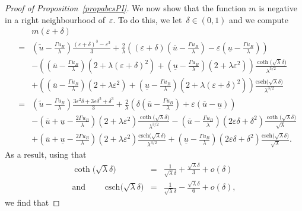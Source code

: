 \documentclass[12pt,a4paper,intlimits,sumlimits]{amsart}
\theoremstyle{definition}
\theoremstyle{plain}
\numberwithin{equation}{section}
\begin{document}
\begin{proof}[Proof of Proposition~\ref{propabcsPI}]
We now show that the function $m$ is negative in a right neighbourhood of~$\varepsilon$. To do this, we let~$\delta\in(0,1)$ and we compute
\begin{eqnarray*}&&
m(\varepsilon+\delta)\\&=&
\left(\widetilde u-\frac{\Gamma u_B}\lambda\right)
\frac{(\varepsilon+\delta)^3-\varepsilon^3}{3}
+\frac2{\lambda}\left(
(\varepsilon+\delta)\left(\overline{u}-\frac{\Gamma u_B}{\lambda}\right)
-\varepsilon\left(\underline{u}-\frac{\Gamma u_B}{\lambda}
\right)\right)
\\&&
-\left(
\left(\overline{u}-\frac{\Gamma u_B}{\lambda}\right)
(2 + \lambda (\varepsilon+\delta)^2) 
+\left(\underline{u}-\frac{\Gamma u_B}{\lambda}
\right)(2 + \lambda \varepsilon^2) \right)
\frac{\coth\big(\sqrt\lambda \delta\big)}{\lambda^{3/2}}
\\&&+
\left(
\left(\overline{u}-\frac{\Gamma u_B}{\lambda}\right)(2 + \lambda \varepsilon^2) 
+
\left(\underline{u}-\frac{\Gamma u_B}{\lambda}\right)
(2 + \lambda (\varepsilon+\delta)^2) \right)
\frac{\text{csch}\big(\sqrt{\lambda}\delta\big)}{\lambda^{3/2}}\\
&=&\left(\widetilde u-\frac{\Gamma u_B}\lambda\right)
\frac{3\varepsilon^2\delta+3\varepsilon\delta^2+\delta^3}{3}
+\frac2{\lambda}\left(
\delta\left(\overline{u}-\frac{\Gamma u_B}{\lambda}\right)
+\varepsilon(\overline{u}-\underline{u})\right)
\\&&
-\left(\overline{u}+\underline{u}-\frac{2\Gamma u_B}{\lambda}\right)
(2 + \lambda \varepsilon^2)
\frac{\coth\big(\sqrt\lambda \delta\big)}{\lambda^{3/2}}
-\left(\overline{u}-\frac{\Gamma u_B}\lambda\right)(2\varepsilon\delta+\delta^2)
\frac{\coth\big(\sqrt\lambda \delta\big)}{\sqrt\lambda}
\\&&+
\left(\overline{u}+\underline{u}-\frac{2\Gamma u_B}{\lambda}\right)
(2 + \lambda \varepsilon^2) 
\frac{\text{csch}\big(\sqrt{\lambda}\delta\big)}{\lambda^{3/2}}
+
\left(\underline{u}-\frac{\Gamma u_B}\lambda\right)(2\varepsilon\delta+\delta^2)
\frac{\text{csch}\big(\sqrt{\lambda}\delta\big)}{\sqrt\lambda}
.
\end{eqnarray*}
As a result, using that
\begin{eqnarray*}
\coth\big(\sqrt\lambda \delta\big)&=&
\frac{1}{\sqrt{\lambda}\delta}+\frac{\sqrt{\lambda}\delta}{3}+o(\delta)
\\
{\mbox{and }}\qquad 
\text{csch}\big(\sqrt{\lambda}\delta\big)&=&
\frac{1}{\sqrt{\lambda}\delta}
-\frac{\sqrt{\lambda}\delta}{6}+o(\delta),\end{eqnarray*}
we find that

\end{proof}
\end{document}
